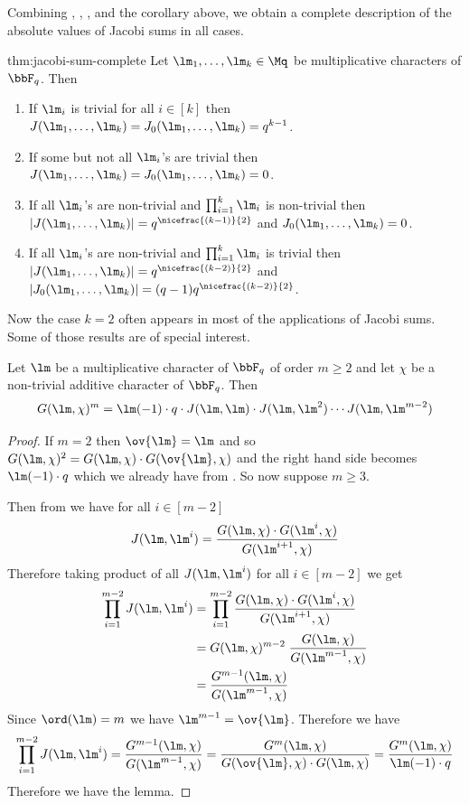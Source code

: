 Combining , , , and the corollary above, we obtain a complete description of the absolute values of Jacobi sums in all cases.
\begin{Theorem}{}{thm:jacobi-sum-complete}
  Let $\lm_1,\dots,\lm_k\in\Mq$ be multiplicative characters of $\bbF_q$. Then
  \begin{enumerate}[label=(\roman*)]
    \item If $\lm_i$ is trivial for all $i\in[k]$ then $J(\lm_1,\dots,\lm_k)=J_0(\lm_1,\dots,\lm_k)=q^{k-1}$.
    \item If some but not all $\lm_i$'s are trivial then $J(\lm_1,\dots,\lm_k)=J_0(\lm_1,\dots,\lm_k)=0$.
    \item If all $\lm_i$'s are non-trivial and $\prod_{i=1}^k\lm_i$ is non-trivial then $|J(\lm_1,\dots,\lm_k)|=q^{\nicefrac{(k-1)}{2}}$ and $J_0(\lm_1,\dots,\lm_k)=0$.
    \item If all $\lm_i$'s are non-trivial and $\prod_{i=1}^k\lm_i$ is trivial then $|J(\lm_1,\dots,\lm_k)|=q^{\nicefrac{(k-2)}{2}}$ and $|J_0(\lm_1,\dots,\lm_k)|=(q-1)q^{\nicefrac{(k-2)}{2}}$.
  \end{enumerate}
\end{Theorem}

Now the case $k=2$ often appears in most of the applications of Jacobi sums. Some of those results are of special interest. 
\begin{lemma}{}{}
  Let $\lm$ be a multiplicative character of $\bbF_q$ of order $m\geq 2$ and let $\chi$ be a non-trivial additive character of $\bbF_q$. Then $$G(\lm,\chi)^m=\lm(-1)\cdot q\cdot J(\lm,\lm)\cdot J(\lm,\lm^2)\cdots J(\lm,\lm^{m-2})$$ 
\end{lemma}
\begin{proof}
  If $m=2$ then $\ov{\lm}=\lm$ and so $G(\lm,\chi)^2=G(\lm,\chi)\cdot G(\ov{\lm},\chi)$ and the right hand side becomes $\lm(-1)\cdot q$ which we already have from . So now suppose $m\geq 3$. 

  Then from  we have for all $i\in[m-2]$ $$J(\lm,\lm^i)=\frac{G(\lm,\chi)\cdot G(\lm^i,\chi)}{G(\lm^{i+1},\chi)}$$ Therefore taking product of all $J(\lm,\lm^i)$ for all $i\in[m-2]$ we get \begin{align*}
    \prod_{i=1}^{m-2}J(\lm,\lm^i) & = \prod_{i=1}^{m-2}\frac{G(\lm,\chi)\cdot G(\lm^i,\chi)}{G(\lm^{i+1},\chi)}\\ 
    & =G(\lm,\chi)^{m-2}\; \frac{G(\lm,\chi)}{G(\lm^{m-1},\chi)}\\ 
    & = \frac{G^{m-1}(\lm,\chi)}{G(\lm^{m-1},\chi)}
  \end{align*}
  Since $\ord(\lm)=m$ we have $\lm^{m-1}=\ov{\lm}$. Therefore we have $$\prod_{i=1}^{m-2}J(\lm,\lm^i)=\frac{G^{m-1}(\lm,\chi)}{G(\lm^{m-1},\chi)}=\frac{G^m(\lm,\chi)}{G(\ov{\lm},\chi)\cdot G(\lm,\chi)}= \frac{G^m(\lm,\chi)}{\lm(-1)\cdot q}$$Therefore we have the lemma. 
\end{proof}

